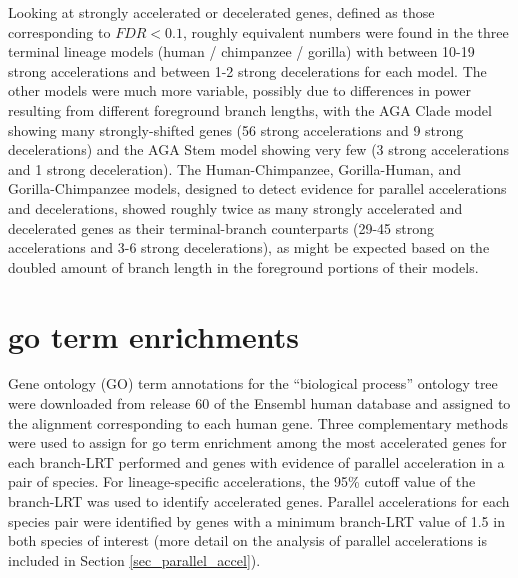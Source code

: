 Looking at strongly accelerated or decelerated genes, defined as those
corresponding to $FDR<0.1$, roughly equivalent numbers were found in
the three terminal lineage models (human / chimpanzee / gorilla) with
between 10-19 strong accelerations and between 1-2 strong
decelerations for each model. The other models were much more
variable, possibly due to differences in power resulting from
different foreground branch lengths, with the AGA Clade model showing
many strongly-shifted genes (56 strong accelerations and 9 strong
decelerations) and the AGA Stem model showing very few (3 strong
accelerations and 1 strong deceleration). The Human-Chimpanzee,
Gorilla-Human, and Gorilla-Chimpanzee models, designed to detect
evidence for parallel accelerations and decelerations, showed roughly
twice as many strongly accelerated and decelerated genes as their
terminal-branch counterparts (29-45 strong accelerations and 3-6
strong decelerations), as might be expected based on the doubled
amount of branch length in the foreground portions of their models.

\section{\acf{go} term enrichments}

Gene ontology (GO) term annotations for the ``biological process''
ontology tree were downloaded from release 60 of the Ensembl human
database \citep{Flicek2011} and assigned to the alignment
corresponding to each human gene. Three complementary methods were
used to assign \pvs for \ac{go} term enrichment among the most
accelerated genes for each branch-LRT performed and genes with
evidence of parallel acceleration in a pair of species. For
lineage-specific accelerations, the 95\% \chisq cutoff value of the
branch-LRT was used to identify accelerated genes. Parallel
accelerations for each species pair were identified by genes with a
minimum branch-LRT value of 1.5 in both species of interest (more
detail on the analysis of parallel accelerations is included in
Section \ref{sec_parallel_accel}).

